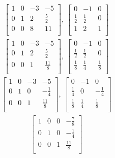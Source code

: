 \documentclass[12pt]{article}
\begin{document}
\begin{enumerate}
\begin{align*}
\begin{bmatrix}
        1  & 0  & -3 & -5\\
        0  & 1  & 2  & \frac{5}{2}\\
        0  & 0  & 8  & 11\\
      \end{bmatrix},\
      \begin{bmatrix}
        0  & -1 & 0\\
        \frac{1}{2} & \frac{1}{2} & 0\\
        1 & 2  & 1\\
      \end{bmatrix}
    \end{align*}
    \begin{align*}
      \begin{bmatrix}
        1  & 0  & -3 & -5\\
        0  & 1  & 2  & \frac{5}{2}\\
        0  & 0  & 1  & \frac{11}{8}\\
      \end{bmatrix},\
      \begin{bmatrix}
        0  & -1 & 0\\
        \frac{1}{2} & \frac{1}{2} & 0\\
        \frac{1}{8} & \frac{1}{4} & \frac{1}{8}\\
      \end{bmatrix}
    \end{align*}
    \begin{align*}
      \begin{bmatrix}
        1  & 0  & -3 & -5\\
        0  & 1  & 0  & -\frac{1}{4}\\
        0  & 0  & 1  & \frac{11}{8}\\
      \end{bmatrix},\
      \begin{bmatrix}
        0  & -1 & 0\\
        \frac{1}{4} & 0 & -\frac{1}{4}\\
        \frac{1}{8} & \frac{1}{4} & \frac{1}{8}\\
      \end{bmatrix}
    \end{align*}
    \begin{align*}
      \begin{bmatrix}
        1  & 0  & 0  & -\frac{7}{8}\\
        0  & 1  & 0  & -\frac{1}{4}\\
        0  & 0  & 1  & \frac{11}{8}\\

\end{bmatrix}
\end{align*}
\end{enumerate}
\end{document}
